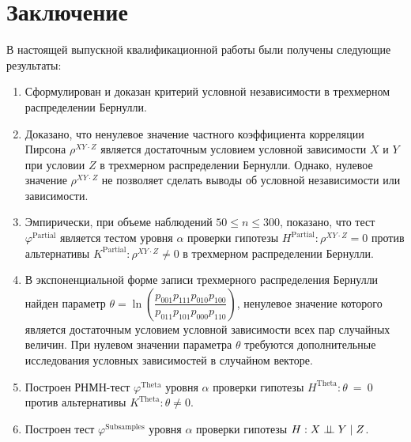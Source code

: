 \section*{Заключение}
В настоящей выпускной квалификационной работы 
были получены следующие результаты:
\begin{enumerate}
    \item Сформулирован и доказан критерий условной независимости
    в трехмерном распределении Бернулли.
    \item Доказано, что ненулевое значение
    частного коэффициента корреляции Пирсона 
    $\rho^{XY \cdot Z}$ является достаточным
    условием условной зависимости $X$ и $Y$ при 
    условии $Z$ в трехмерном распределении Бернулли.
    Однако, нулевое значение $\rho^{XY \cdot Z}$ не позволяет сделать выводы
    об условной независимости или зависимости.
    \item Эмпирически, при объеме наблюдений $50 \leq n \leq 300$,
    показано, что тест
    $\varphi^{\text{Partial}}$ является тестом уровня
    $\alpha$ проверки гипотезы $H^{\text{Partial}}: \rho^{XY\cdot Z}=0$ 
    против альтернативы $K^{\text{Partial}}: \rho^{XY\cdot Z}\neq 0$
    в трехмерном распределении
    Бернулли.
    \item В экспоненциальной форме записи трехмерного 
    распределения Бернулли найден параметр 
    $\theta = \ln  \left(\dfrac{p_{001}p_{111}p_{010}p_{100}}{p_{011}p_{101}p_{000}p_{110}}\right)$,
    ненулевое значение которого является достаточным 
    условием условной зависимости всех пар
    случайных величин.
    При нулевом значении параметра $\theta$ требуются дополнительные
    исследования условных зависимостей в случайном векторе.
    \item Построен РНМН-тест $\varphi^{\text{Theta}}$
    уровня $\alpha$ проверки гипотезы $H^{\text{Theta}}: \theta~=~0$
    против альтернативы $K^{\text{Theta}}: \theta\neq 0$.
    \item Построен тест $\varphi^{\text{Subsamples}}$ 
    уровня $\alpha$
    проверки гипотезы $H: X \perp\!\!\!\perp Y \mid Z$.
\end{enumerate}
